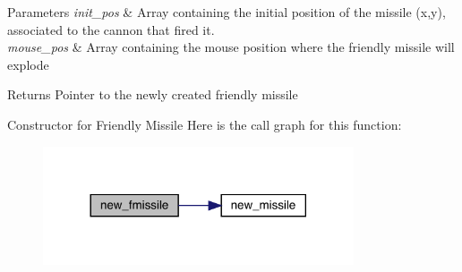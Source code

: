 \begin{DoxyParams}{Parameters}
{\em init\+\_\+pos} & Array containing the initial position of the missile (x,y), associated to the cannon that fired it. \\
\hline
{\em mouse\+\_\+pos} & Array containing the mouse position where the friendly missile will explode\\
\hline
\end{DoxyParams}
\begin{DoxyReturn}{Returns}
Pointer to the newly created friendly missile
\end{DoxyReturn}
Constructor for Friendly Missile Here is the call graph for this function\+:\nopagebreak
\begin{figure}[H]
\begin{center}
\leavevmode
\includegraphics[width=260pt]{group___missile_ga163468dc0fdc7c61c009528ed5099753_cgraph}
\end{center}
\end{figure}
